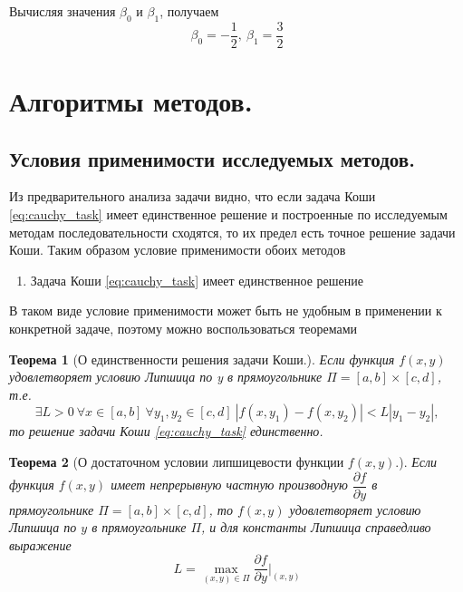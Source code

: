 \documentclass[a4paper, 12pt]{article}
\theoremstyle{mythm}
\newtheorem{theorem}{Теорема}
\begin{document}
	Вычисляя значения $\beta_0$ и $\beta_1$, получаем
	\begin{equation}
		\beta_0 = -\dfrac{1}{2},\ \beta_1 = \dfrac{3}{2}
	\end{equation}

	\section{Алгоритмы методов.}
	
	\subsection{Условия применимости исследуемых методов.}
	
	Из предварительного анализа задачи видно, что если задача Коши \eqref{eq:cauchy_task} имеет единственное решение и построенные по исследуемым методам последовательности сходятся, то их предел есть точное решение задачи Коши. Таким образом условие применимости обоих методов
	\begin{enumerate}
		\item Задача Коши \eqref{eq:cauchy_task} имеет единственное решение
	\end{enumerate}

	В таком виде условие применимости может быть не удобным в применении к конкретной задаче, поэтому можно воспользоваться теоремами
	\begin{theorem}[О единственности решения задачи Коши.]
		Если функция $f(x,y)$ удовлетворяет условию Липшица по y в прямоугольнике $\Pi = [a, b] \times [c, d]$, т.е.
		\begin{equation}
			\exists L > 0\ \forall x \in [a,b]\ \forall y_1,y_2\in[c,d]\ |f(x,y_1) - f(x,y_2)| < L|y_1-y_2|,
		\end{equation} 
		то решение задачи Коши \eqref{eq:cauchy_task} единственно.
	\end{theorem}
	\begin{theorem}[О достаточном условии липшицевости функции $f(x,y)$.]
		Если функция $f(x,y)$ имеет непрерывную частную производную $\dfrac{\partial f}{\partial y}$ в прямоугольнике $\Pi = [a, b] \times [c, d]$, то $f(x,y)$ удовлетворяет условию Липшица по $y$ в прямоугольнике $\Pi$, и для константы Липшица справедливо выражение
		\begin{equation}
			L = \max\limits_{(x,y)\in \Pi}\dfrac{\partial f}{\partial y}\bigg|_{(x,y)}
		\end{equation}
	\end{theorem}
	
\end{document}

